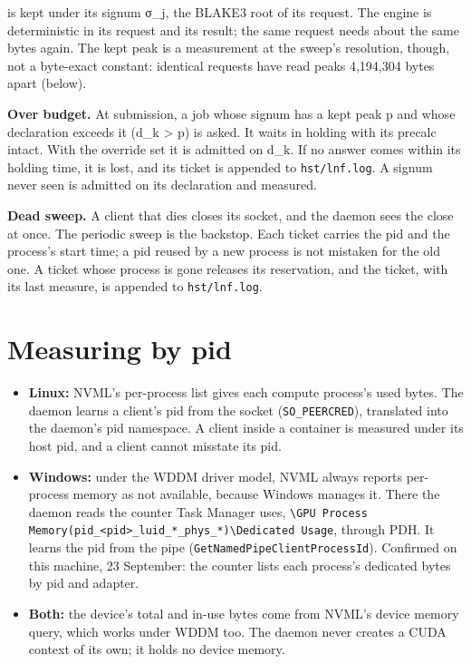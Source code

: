 is kept under its signum σ\_\allowbreak{}j, the BLAKE3 root of its request. The engine is deterministic in its request and its result; the same request needs about the same bytes again. The kept peak is a measurement at the sweep's resolution, though, not a byte-exact constant: identical requests have read peaks 4,194,304 bytes apart (below).

\textbf{Over budget.} At submission, a job whose signum has a kept peak p and whose declaration exceeds it (d\_\allowbreak{}k > p) is asked. It waits in holding with its precalc intact. With the override set it is admitted on d\_\allowbreak{}k. If no answer comes within its holding time, it is lost, and its ticket is appended to \texttt{hst/\allowbreak{}lnf.\allowbreak{}log}. A signum never seen is admitted on its declaration and measured.

\textbf{Dead sweep.} A client that dies closes its socket, and the daemon sees the close at once. The periodic sweep is the backstop. Each ticket carries the pid and the process's start time; a pid reused by a new process is not mistaken for the old one. A ticket whose process is gone releases its reservation, and the ticket, with its last measure, is appended to \texttt{hst/\allowbreak{}lnf.\allowbreak{}log}.

\section{\texorpdfstring{Measuring by pid}{Measuring by pid}}

\begin{itemize}
\item \textbf{Linux:} NVML's per-process list gives each compute process's used bytes. The daemon learns a client's pid from the socket (\texttt{SO\_\allowbreak{}PEERCRED}), translated into the daemon's pid namespace. A client inside a container is measured under its host pid, and a client cannot misstate its pid.
\item \textbf{Windows:} under the WDDM driver model, NVML always reports per-process memory as not available, because Windows manages it. There the daemon reads the counter Task Manager uses, \texttt{\textbackslash{}GPU Process Memory(pid\_\allowbreak{}<pid>\_\allowbreak{}luid\_\allowbreak{}*\_\allowbreak{}phys\_\allowbreak{}*)\textbackslash{}Dedicated Usage}, through PDH. It learns the pid from the pipe (\texttt{Get\allowbreak{}Named\allowbreak{}Pipe\allowbreak{}Client\allowbreak{}Process\allowbreak{}Id}). Confirmed on this machine, 23 September: the counter lists each process's dedicated bytes by pid and adapter.
\item \textbf{Both:} the device's total and in-use bytes come from NVML's device memory query, which works under WDDM too. The daemon never creates a CUDA context of its own; it holds no device memory.
\end{itemize}

